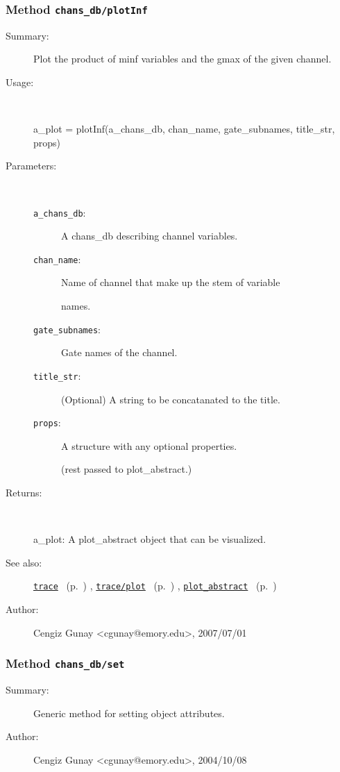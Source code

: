 \subsubsection[Method \texttt{plotInf}]{Method \texttt{chans\_db/plotInf}}%
%
\label{ref_chans_db__plotInf}%
\hypertarget{ref_chans_db__plotInf}{}%
\begin{description}
\item[Summary:]Plot the product of minf variables and the gmax of the given channel.
%
\item[Usage:]~%
\begin{lyxcode}%
a\_plot = plotInf(a\_chans\_db, chan\_name, gate\_subnames, title\_str, props)
%
\end{lyxcode}%
%
%
\item[Parameters:]~
\begin{description}%
\item[\texttt{a\_chans\_db}:]
 A chans\_db describing channel variables.
\item[\texttt{chan\_name}:]
 Name of channel that make up the stem of variable

names.
\item[\texttt{gate\_subnames}:]
 Gate names of the channel.
\item[\texttt{title\_str}:]
 (Optional) A string to be concatanated to the title.
\item[\texttt{props}:]
 A structure with any optional properties.

(rest passed to plot\_abstract.)
\end{description}%
%
\item[Returns:
]~

	a\_plot: A plot\_abstract object that can be visualized.
%
%
\item[See also:]%
\hyperlink{ref_trace}{\texttt{trace}}%
\ (p.~\pageref{ref_trace})%
%
, \hyperlink{ref_trace__plot}{\texttt{trace/plot}}%
\ (p.~\pageref{ref_trace__plot})%
%
, \hyperlink{ref_plot_abstract}{\texttt{plot\_abstract}}%
\ (p.~\pageref{ref_plot_abstract})%
%
%
\item[Author:]%
Cengiz Gunay <cgunay@emory.edu>, 2007/07/01
%
\end{description}
\methodline%
\subsubsection[Method \texttt{set}]{Method \texttt{chans\_db/set}}%
%
\label{ref_chans_db__set}%
\hypertarget{ref_chans_db__set}{}%
\begin{description}
\item[Summary:]Generic method for setting object attributes.
%
%
%
%
%
%
%
\item[Author:]%
Cengiz Gunay <cgunay@emory.edu>, 2004/10/08
%
\end{description}
\methodline%

